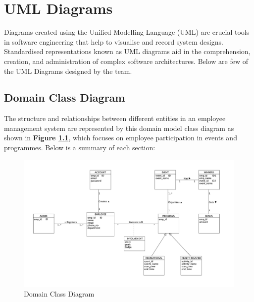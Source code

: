\chapter{UML Diagrams}

Diagrams created using the Unified Modelling Language (UML) are crucial tools in software engineering that help to visualise and record system designs. Standardised representations known as UML diagrams aid in the comprehension, creation, and administration of complex software architectures. Below are few of the UML Diagrams designed by the team.

\section{Domain Class Diagram}
The structure and relationships between different entities in an employee management system are represented by this domain model class diagram as shown in \textbf{Figure \ref{fig:domainClass}}, which focuses on employee participation in events and programmes. Below is a summary of each section:
\begin{figure}[h!t]
    \centering
    \includegraphics[width=\textwidth]{images/domainClass.png}
    \caption{Domain Class Diagram}
    \label{fig:domainClass}
\end{figure}

\FloatBarrier

